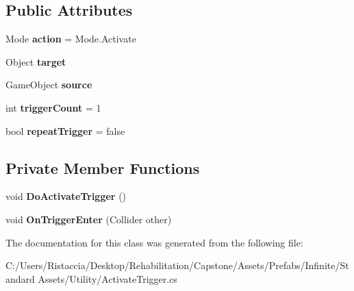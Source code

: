 \subsection*{Public Attributes}
\begin{DoxyCompactItemize}
\item 
\mbox{\label{class_unity_standard_assets_1_1_utility_1_1_activate_trigger_a28fc3aac5d0e1054b21199fa04ef251d}} 
Mode {\bfseries action} = Mode.\+Activate
\item 
\mbox{\label{class_unity_standard_assets_1_1_utility_1_1_activate_trigger_a4e9d860dd1d5ca73584582f3d6162906}} 
Object {\bfseries target}
\item 
\mbox{\label{class_unity_standard_assets_1_1_utility_1_1_activate_trigger_ab0f64a7f9f1ae14bdd05dd20ba9bc81d}} 
Game\+Object {\bfseries source}
\item 
\mbox{\label{class_unity_standard_assets_1_1_utility_1_1_activate_trigger_a2dfd5f275433261a67b8cda441c8291d}} 
int {\bfseries trigger\+Count} = 1
\item 
\mbox{\label{class_unity_standard_assets_1_1_utility_1_1_activate_trigger_a2efeb1eed91a40bce625222c1de6177d}} 
bool {\bfseries repeat\+Trigger} = false
\end{DoxyCompactItemize}
\subsection*{Private Member Functions}
\begin{DoxyCompactItemize}
\item 
\mbox{\label{class_unity_standard_assets_1_1_utility_1_1_activate_trigger_a7d10473278baf38fb9d90bf381517832}} 
void {\bfseries Do\+Activate\+Trigger} ()
\item 
\mbox{\label{class_unity_standard_assets_1_1_utility_1_1_activate_trigger_abfacc3722cac4f81e3b158529c2e8bcb}} 
void {\bfseries On\+Trigger\+Enter} (Collider other)
\end{DoxyCompactItemize}


The documentation for this class was generated from the following file\+:\begin{DoxyCompactItemize}
\item 
C\+:/\+Users/\+Ristaccia/\+Desktop/\+Rehabilitation/\+Capstone/\+Assets/\+Prefabs/\+Infinite/\+Standard Assets/\+Utility/Activate\+Trigger.\+cs\end{DoxyCompactItemize}
